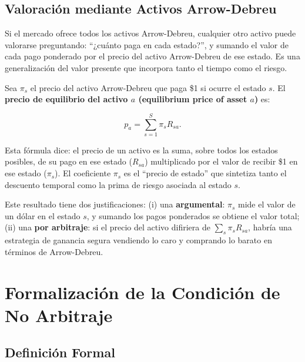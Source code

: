 \documentclass[12pt]{article}
\begin{document}
\subsection{Valoraci\'on mediante Activos Arrow-Debreu}

\begin{intuicion}
Si el mercado ofrece todos los activos Arrow-Debreu, cualquier otro activo puede valorarse preguntando: ``¿cu\'anto paga en cada estado?'', y sumando el valor de cada pago ponderado por el precio del activo Arrow-Debreu de ese estado. Es una generalizaci\'on del valor presente que incorpora tanto el tiempo como el riesgo.
\end{intuicion}

Sea $\pi_s$ el precio del activo Arrow-Debreu que paga \$1 si ocurre el estado $s$. El \textbf{precio de equilibrio del activo $a$ (equilibrium price of asset $a$)} es:

\begin{equation}
  p_a = \sum_{s=1}^{S} \pi_s R_{sa}.
  \label{eq:precioadactivo}
\end{equation}

\begin{intuicionmat}
Esta f\'ormula dice: el precio de un activo es la suma, sobre todos los estados posibles, de su pago en ese estado ($R_{sa}$) multiplicado por el valor de recibir \$1 en ese estado ($\pi_s$). El coeficiente $\pi_s$ es el ``precio de estado'' que sintetiza tanto el descuento temporal como la prima de riesgo asociada al estado $s$.
\end{intuicionmat}

Este resultado tiene dos justificaciones: (i) una \textbf{argumental}: $\pi_s$ mide el valor de un d\'olar en el estado $s$, y sumando los pagos ponderados se obtiene el valor total; (ii) una \textbf{por arbitraje}: si el precio del activo difiriera de $\sum_s \pi_s R_{sa}$, habr\'ia una estrategia de ganancia segura vendiendo lo caro y comprando lo barato en t\'erminos de Arrow-Debreu.

\section{Formalizaci\'on de la Condici\'on de No Arbitraje}

\subsection{Definici\'on Formal}
\end{document}
